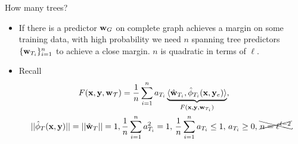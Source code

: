 \documentclass[first=dgreen,second=purple,logo=yellowexc]{aaltoslides}
\begin{document}
%
\begin{frame}{How many trees?}
	\begin{itemize}\footnotesize
		\item If there is a predictor $\mathbf {w}_G$ on complete graph achieves a margin on some training data, with high probability we need $n$ spanning tree predictors $\{\mathbf {w}_{T_i}\}_{i=1}^n$ to achieve a close margin. $n$ is quadratic in terms of $\ell$.
		\item Recall
		\begin{align*}
			F(\mathbf {x},\mathbf {y},\mathbf {w}_{\mathcal{T}}) &= \frac{1}{n}\sum_{i = 1}^{n}a_{T_i}\underbrace{\langle \hat{\mathbf {w}}_{T_i}, \hat{\phi}_{T_i}(\mathbf {x},\mathbf {y}_e) \rangle}_{F(\mathbf {x},\mathbf {y},\mathbf {w}_{T_i})},\\
			||\hat{\phi}_T(\mathbf {x},\mathbf {y})||=||\hat{\mathbf {w}}_{T}||=1,\, & \frac{1}{n}\sum_{i = 1}^{n}a_{T_i}^2=1, \, \frac{1}{n}\sum_{i = 1}^{n}a_{T_i}\le1,\, a_{T_i}\ge0,\, \xcancel{n=\ell^{\ell-2}}.
		\end{align*}
	\end{itemize}
\end{frame}
\end{document}
